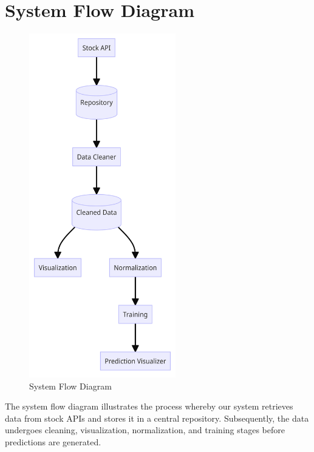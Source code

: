 \documentclass[./main.tex]{subfiles}
\begin{document}
\section{System Flow Diagram}
\begin{figure}[H]
    \centering
    \includegraphics[width=0.50\linewidth ,height=15cm]{images/SystemDiagram.png}
    \caption{System Flow Diagram}
    \label{fig:4.2}
\end{figure}


\noindent The system flow diagram illustrates the process whereby our system retrieves data from stock APIs and stores it in a central repository. Subsequently, the data undergoes cleaning, visualization, normalization, and training stages before predictions are generated.
\end{document}
